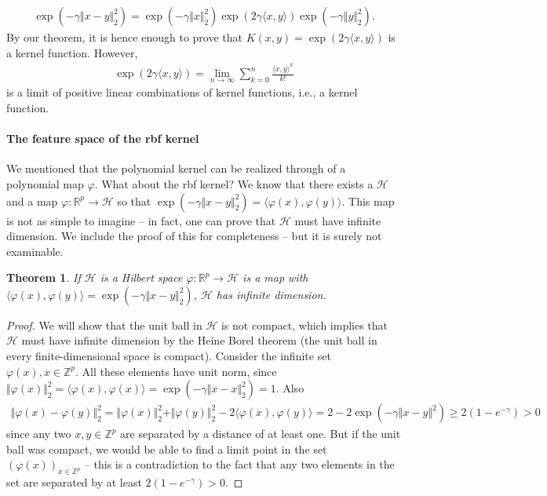 \documentclass{article}
\newcommand{\calH}{\mathcal{H}}
\newcommand{\sprod}[1]{\langle #1 \rangle}
\newcommand{\R}{\mathbb{R}}
\newcommand{\Z}{\mathbb{Z}}
\newtheorem{theorem}{Theorem}
\newcommand{\norm}[1]{\Vert #1 \Vert}
\begin{document}
\begin{align*}
   \exp(-\gamma \norm{x-y}_2^2) = \exp(-\gamma\norm{x}_2^2) \exp(2\gamma \sprod{x,y})\exp(-\gamma \norm{y}_2^2).
\end{align*}
By our theorem, it is hence enough to prove that $K(x,y) =\exp(2\gamma \sprod{x,y})$ is a kernel function. However,
\begin{align*}
    \exp(2\gamma \sprod{x,y}) = \lim_{n\to \infty} \sum_{k=0}^n \frac{\sprod{x,y}^k}{k!}
\end{align*}
is a limit of positive linear combinations of kernel functions, i.e., a kernel function.

\paragraph{The feature space of the rbf kernel} We mentioned that the polynomial kernel can be realized through of a polynomial map $\varphi$. What about the rbf kernel? We know that there exists a $\calH$ and a map $\varphi:\R^p\to \calH$ so that $\exp(-\gamma\norm{x-y}_2^2)= \sprod{\varphi(x),\varphi(y)}$. This map is not as simple to imagine -- in fact, one can prove that $\calH$ must have infinite dimension. We include the proof of this for completeness -- but it is surely not examinable.

\begin{theorem}
    If $\calH$ is a Hilbert space $\varphi:\R^p\to \calH$ is a map with $\sprod{\varphi(x),\varphi(y)} = \exp(-\gamma \norm{x-y}_2^2)$, $\calH$ has infinite dimension.
\end{theorem}
\begin{proof}
    We will show that the unit ball in $\calH$ is not compact, which implies that $\calH$ must have infinite dimension by the Heine Borel theorem (the unit ball in every finite-dimensional space is compact). Consider the infinite set $\varphi(x), x\in \Z^p$. All these elements have unit norm, since $\norm{\varphi(x)}_2^2=\sprod{\varphi(x),\varphi(x)}=\exp(-\gamma \norm{x-x}_2^2)=1$. Also
    \begin{align*}
        \norm{\varphi(x)-\varphi(y)}_2^2 = \norm{\varphi(x)}_2^2+\norm{\varphi(y)}_2^2 - 2\sprod{\varphi(x),\varphi(y)} = 2 - 2\exp(-\gamma\norm{x-y}^2)\geq 2(1-e^{-\gamma})>0
    \end{align*}
    since any two $x,y\in \Z^p$ are separated by a distance of at least one. But if the unit ball was compact, we would be able to find a limit point in the set $(\varphi(x))_{x\in \Z^p}$ -- this is a contradiction to the fact that any two elements in the set are separated by at least $2(1-e^{-\gamma})>0$.
\end{proof}
\end{document}
